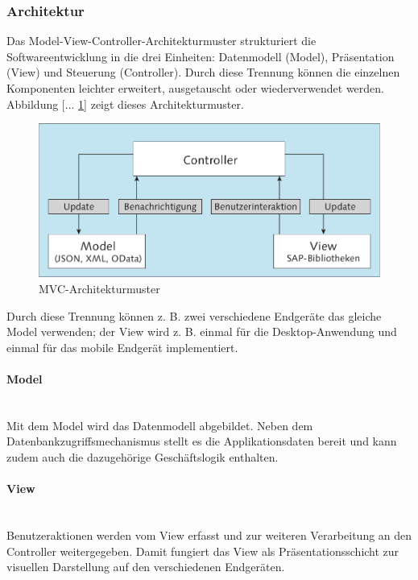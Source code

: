 \subsubsection{Architektur}
\glqq Das Model-View-Controller-Architekturmuster strukturiert die Softwareentwicklung in die drei Einheiten: Datenmodell (Model), Präsentation (View) und Steuerung (Controller). Durch diese Trennung können die einzelnen Komponenten leichter erweitert, ausgetauscht oder wiederverwendet werden. Abbildung [... \ref{fig:mvcarch}] zeigt dieses Architekturmuster.
	
\vspace{1em}
\begin{figure}[htb]
  \centering
  \includegraphics[width=0.7\linewidth]{abb/mvc_arch2}
  \caption[MVC-Architekturmuster]{MVC-Architekturmuster \cite[S.124]{AntoEinf2014}}
  \label{fig:mvcarch}
\end{figure}

Durch diese Trennung können z. B. zwei verschiedene Endgeräte das gleiche Model verwenden; der View wird z. B. einmal für die Desktop-Anwendung und einmal für das mobile Endgerät implementiert.\grqq{}\cite[S.123]{AntoEinf2014}

\paragraph{Model}$\;$ \\
Mit dem Model wird das Datenmodell abgebildet. Neben dem Datenbankzugriffsmechanismus stellt es die Applikationsdaten bereit und kann zudem auch die dazugehörige Geschäftslogik enthalten.

\paragraph{View}$\;$ \\
Benutzeraktionen werden vom View erfasst und zur weiteren Verarbeitung an den Controller weitergegeben. Damit fungiert das View als Präsentationsschicht zur visuellen Darstellung auf den verschiedenen Endgeräten.

